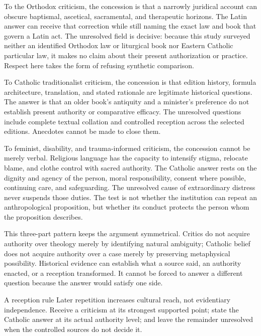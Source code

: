To the Orthodox criticism, the concession is that a narrowly juridical account
can obscure baptismal, ascetical, sacramental, and therapeutic horizons. The
Latin answer can receive that correction while still naming the exact law and
book that govern a Latin act. The unresolved field is decisive: because this
study surveyed neither an identified Orthodox law or liturgical book nor
Eastern Catholic particular law, it makes no claim about their present
authorization or practice. Respect here takes the form of refusing synthetic
comparison.

To Catholic traditionalist criticism, the concession is that edition history,
formula architecture, translation, and stated rationale are legitimate
historical questions. The answer is that an older book's antiquity and a
minister's preference do not establish present authority or comparative
efficacy. The unresolved questions include complete textual collation and
controlled reception across the selected editions. Anecdotes cannot be made to
close them.

To feminist, disability, and trauma-informed criticism, the concession
cannot be merely verbal. Religious language has the capacity to intensify
stigma, relocate blame, and clothe control with sacred authority. The Catholic
answer rests on the dignity and agency of the person, moral responsibility,
consent where possible, continuing care, and safeguarding. The unresolved
cause of extraordinary distress never suspends those duties. The test is not
whether the institution can repeat an anthropological proposition, but whether
its conduct protects the person whom the proposition describes.

This three-part pattern keeps the argument symmetrical. Critics do not acquire
authority over theology merely by identifying natural ambiguity; Catholic
belief does not acquire authority over a case merely by preserving
metaphysical possibility. Historical evidence can establish what a source
said, an authority enacted, or a reception transformed. It cannot be forced to
answer a different question because the answer would satisfy one side.

\begin{studybox}{A reception rule}
Later repetition increases cultural reach, not evidentiary independence.
Receive a criticism at its strongest supported point; state the Catholic
answer at its actual authority level; and leave the remainder unresolved when
the controlled sources do not decide it.
\end{studybox}
